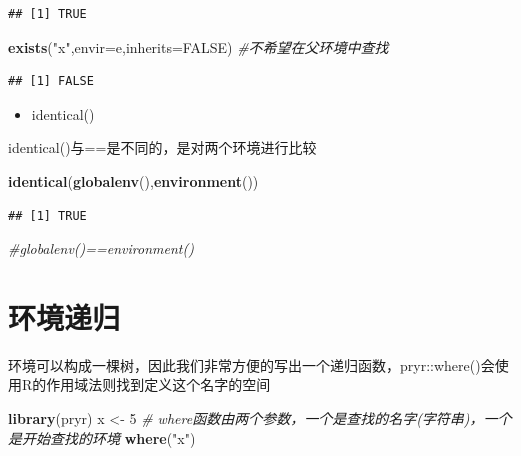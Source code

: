 \documentclass[]{book}
\newenvironment{Shaded}{\begin{snugshade}}{\end{snugshade}}
\newcommand{\KeywordTok}[1]{\textcolor[rgb]{0.13,0.29,0.53}{\textbf{#1}}}
\newcommand{\DataTypeTok}[1]{\textcolor[rgb]{0.13,0.29,0.53}{#1}}
\newcommand{\DecValTok}[1]{\textcolor[rgb]{0.00,0.00,0.81}{#1}}
\newcommand{\StringTok}[1]{\textcolor[rgb]{0.31,0.60,0.02}{#1}}
\newcommand{\CommentTok}[1]{\textcolor[rgb]{0.56,0.35,0.01}{\textit{#1}}}
\newcommand{\OtherTok}[1]{\textcolor[rgb]{0.56,0.35,0.01}{#1}}
\newcommand{\NormalTok}[1]{#1}
\providecommand{\tightlist}{%
  \setlength{\itemsep}{0pt}\setlength{\parskip}{0pt}}
\begin{document}
\begin{verbatim}
## [1] TRUE
\end{verbatim}

\begin{Shaded}
\begin{Highlighting}[]
\KeywordTok{exists}\NormalTok{(}\StringTok{"x"}\NormalTok{,}\DataTypeTok{envir=}\NormalTok{e,}\DataTypeTok{inherits=}\OtherTok{FALSE}\NormalTok{) }\CommentTok{#不希望在父环境中查找}
\end{Highlighting}
\end{Shaded}

\begin{verbatim}
## [1] FALSE
\end{verbatim}

\begin{itemize}
\tightlist
\item
  identical()
\end{itemize}

identical()与==是不同的，是对两个环境进行比较

\begin{Shaded}
\begin{Highlighting}[]
\KeywordTok{identical}\NormalTok{(}\KeywordTok{globalenv}\NormalTok{(),}\KeywordTok{environment}\NormalTok{())}
\end{Highlighting}
\end{Shaded}

\begin{verbatim}
## [1] TRUE
\end{verbatim}

\begin{Shaded}
\begin{Highlighting}[]
\CommentTok{#globalenv()==environment()}
\end{Highlighting}
\end{Shaded}

\section{环境递归}

环境可以构成一棵树，因此我们非常方便的写出一个递归函数，pryr::where()会使用R的作用域法则找到定义这个名字的空间

\begin{Shaded}
\begin{Highlighting}[]
\KeywordTok{library}\NormalTok{(pryr)}
\NormalTok{x <-}\StringTok{ }\DecValTok{5}
\CommentTok{# where函数由两个参数，一个是查找的名字(字符串)，一个是开始查找的环境}
\KeywordTok{where}\NormalTok{(}\StringTok{"x"}\NormalTok{)}
\end{Highlighting}
\end{Shaded}
\end{document}
